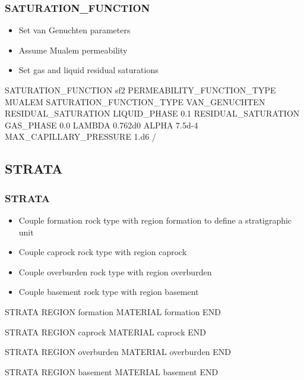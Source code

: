 \documentclass{beamer}
\newcommand\greencomment[1]{{{\color{green} #1}}}
\begin{document}
\begin{frame}[fragile]\frametitle{SATURATION\_FUNCTION}

\begin{itemize}	
\item Set van Genuchten parameters
\item Assume Mualem permeability
\item Set gas and liquid residual saturations
\end{itemize}

\begin{semiverbatim}
SATURATION_FUNCTION sf2
  PERMEABILITY_FUNCTION_TYPE MUALEM
  SATURATION_FUNCTION_TYPE VAN_GENUCHTEN
  RESIDUAL_SATURATION LIQUID_PHASE 0.1
  RESIDUAL_SATURATION GAS_PHASE 0.0
  LAMBDA 0.762d0
  ALPHA 7.5d-4
  MAX_CAPILLARY_PRESSURE 1.d6
/
\end{semiverbatim}

\end{frame}

\subsection{STRATA}

\begin{frame}\frametitle{STRATA}

\begin{itemize}
\item Couple \greencomment{formation} rock type with region \greencomment{formation} to define a stratigraphic unit
\item Couple \greencomment{caprock} rock type with region \greencomment{caprock}
\item Couple \greencomment{overburden} rock type with region \greencomment{overburden}
\item Couple \greencomment{basement} rock type with region \greencomment{basement}
\end{itemize}

\begin{semiverbatim}

STRATA
  REGION formation
  MATERIAL formation
END

STRATA
  REGION caprock
  MATERIAL caprock
END

STRATA
  REGION overburden
  MATERIAL overburden
END

STRATA
  REGION basement
  MATERIAL basement
END


\end{semiverbatim}

\end{frame}
\end{document}
